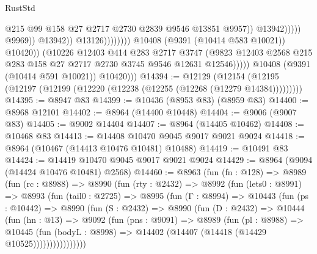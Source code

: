 \begin{lexlean}{RustStd}
\begin{coremodule}
                                                          @215
                                                          @99
                                                          @158
                                                          @27
                                                          @2717
                                                          @2730
                                                          @2839
                                                          @9546
                                                          @13851
                                                          @9957))
                                                      @13942)))))
                                            @9969))
                                        @13942))
                                    @13126))))))))
                    @10408
                    (@9391 (@10414 @583 @10021))
                    @10420))
                (@10226
                  @12403
                  @414
                  @283
                  @2717
                  @3747
                  (@9823 @12403 @2568 @215 @283 @158 @27 @2717 @2730 @3745 @9546 @12631 @12546)))))
          @10408
          (@9391 (@10414 @591 @10021))
          @10420)))
@14394 := @12129
    (@12154 (@12195 (@12197 (@12199 (@12220 (@12238 (@12255 (@12268 (@12279 @14384)))))))))
@14395 := @8947 @83
@14399 := @10436 (@8953 @83) (@8959 @83)
@14400 := @8968 @12101
@14402 := @8964 (@14400 @10448)
@14404 := @9006 (@9007 @83)
@14405 := @9002 @14404
@14407 := @8964 (@14405 @10462)
@14408 := @10468 @83
@14413 := @14408 @10470 @9045 @9017 @9021 @9024
@14418 := @8964 (@10467 (@14413 @10476 @10481) @10488)
@14419 := @10491 @83
@14424 := @14419 @10470 @9045 @9017 @9021 @9024
@14429 := @8964 (@9094 (@14424 @10476 @10481) @2568)
@14460 := @8963
    (fun (fn : @128) =>
    @8989
      (fun (rc : @8988) =>
      @8990
        (fun (rty : @2432) =>
        @8992
          (fun (lets0 : @8991) =>
          @8993
            (fun (tail0 : @2725) =>
            @8995
              (fun (Γ : @8994) =>
              @10443
                (fun (ps : @10442) =>
                @8990
                  (fun (S : @2432) =>
                  @8990
                    (fun (D : @2432) =>
                    @10444
                      (fun (hn : @13) =>
                      @9092
                        (fun (pns : @9091) =>
                        @8989
                          (fun (pl : @8988) =>
                          @10445
                            (fun (bodyL : @8998) =>
                            @14402 (@14407 (@14418 (@14429 @10525))))))))))))))))

\end{coremodule}
\end{lexlean}
